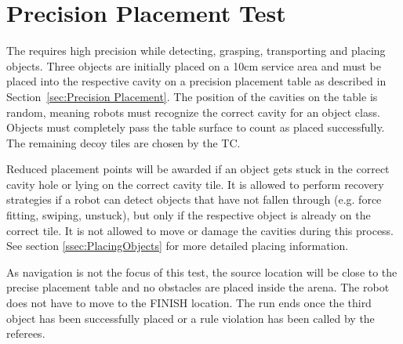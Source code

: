 
\section{Precision Placement Test}
\label{sec:Precision Placement Test}

The  requires high precision while detecting, grasping, transporting and placing objects. Three objects are initially placed on a 10cm service area and must be placed into the respective cavity on a precision placement table as described in Section~\ref{sec:Precision Placement}. The position of the cavities on the table is random, meaning robots must recognize the correct cavity for an object class. Objects must completely pass the table surface to count as placed successfully. The remaining decoy tiles are chosen by the TC.

Reduced placement points will be awarded if an object gets stuck in the correct cavity hole or lying on the correct cavity tile. It is allowed to perform recovery strategies if a robot can detect objects that have not fallen through (e.g. force fitting, swiping, unstuck), but only if the respective object is already on the correct tile.
It is not allowed to move or damage the cavities during this process. See section \ref{ssec:PlacingObjects} for more detailed placing information.

As navigation is not the focus of this test, the source location will be close to the precise placement table and no obstacles are placed inside the arena. The robot does not have to move to the FINISH location. The run ends once the third object has been successfully placed or a rule violation has been called by the referees.

